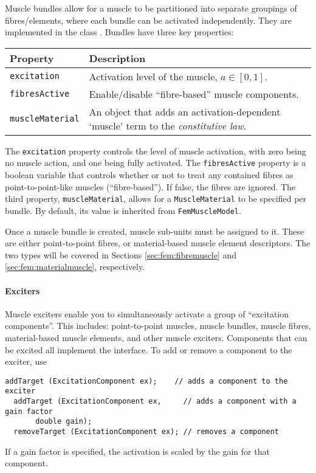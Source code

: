 Muscle bundles allow for a muscle to be partitioned into separate groupings
of fibres/elements, where each bundle can be activated independently.  They 
are implemented in the class .
Bundles have three key properties:
\begin{center}
	\begin{tabular}{|ll|}
		\hline
		Property & Description\\
		\hline
		{\tt excitation} & Activation level of the muscle,  $a\in[0, 1]$.\\
		{\tt fibresActive} & Enable/disable ``fibre-based'' muscle components.\\
		{\tt muscleMaterial} & An object that adds an activation-dependent
		                       `muscle' term to the \emph{constitutive law}.\\
		\hline
	\end{tabular}
\end{center}
The {\tt excitation} property controls the level of muscle activation, with zero 
being no muscle action, and one being fully activated.  The {\tt fibresActive} 
property is a boolean variable that controls whether or not to treat any 
contained fibres as point-to-point-like muscles (``fibre-based'').  If false, 
the fibres are ignored.  The third property, {\tt muscleMaterial}, allows for a 
{\tt MuscleMaterial} to be specified per bundle.  By default, its value is 
inherited from {\tt FemMuscleModel}.

Once a muscle bundle is created, muscle sub-units must be assigned to it.  These
are either point-to-point fibres, or material-based muscle element descriptors.
The two types will be covered in Sections \ref{sec:fem:fibremuscle} and
\ref{sec:fem:materialmuscle}, respectively.

\paragraph{Exciters}
\ifLaTeXML{\newline}

Muscle exciters enable you to simultaneously activate a group of ``excitation 
components''.  This includes: point-to-point muscles, muscle bundles, muscle
fibres, material-based muscle elements, and other muscle exciters.  Components 
that can be excited all implement the 
interface.  To add or remove a component to the exciter, use
\begin{lstlisting}[]
  addTarget (ExcitationComponent ex);    // adds a component to the exciter
  addTarget (ExcitationComponent ex,     // adds a component with a gain factor
  	   double gain);   
  removeTarget (ExcitationComponent ex); // removes a component
\end{lstlisting}
If a gain factor is specified, the activation is scaled by the gain for that
component.

